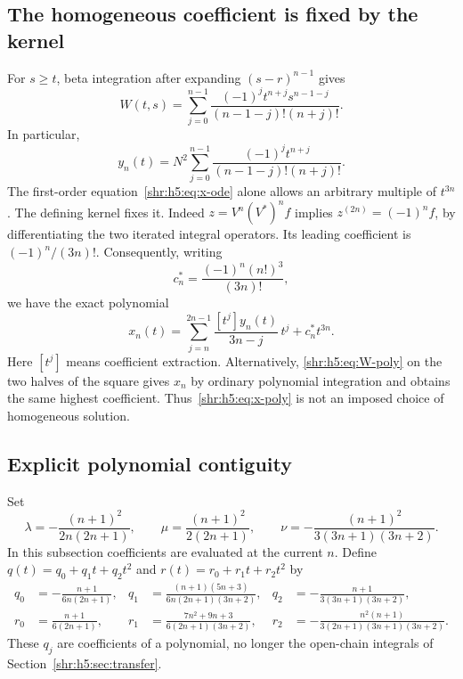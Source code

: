 \documentclass[11pt,letterpaper]{article}
\numberwithin{equation}{section}
\theoremstyle{definition}
\newcommand{\1}{\mathbf 1}
\begin{document}
\subsection{The homogeneous coefficient is fixed by the kernel}
For $s\ge t$, beta integration after expanding $(s-r)^{n-1}$ gives
\begin{equation}
 W(t,s)=\sum_{j=0}^{n-1}
 \frac{(-1)^jt^{n+j}s^{n-1-j}}{(n-1-j)!(n+j)!}.
 \label{shr:h5:eq:W-poly}
\end{equation}
In particular,
\begin{equation}
 y_n(t)=N^2\sum_{j=0}^{n-1}
 \frac{(-1)^jt^{n+j}}{(n-1-j)!(n+j)!}.
 \label{shr:h5:eq:y-poly}
\end{equation}
The first-order equation~\eqref{shr:h5:eq:x-ode} alone allows an arbitrary
multiple of $t^{3n}$. The defining kernel fixes it. Indeed
$z=V^n(V^*)^nf$ implies
$z^{(2n)}=(-1)^nf$, by differentiating the two iterated integral operators.
Its leading coefficient is $(-1)^n/(3n)!$. Consequently, writing
\begin{equation}
 c_n^*=\frac{(-1)^n(n!)^3}{(3n)!},
 \label{shr:h5:eq:cnstar}
\end{equation}
we have the exact polynomial
\begin{equation}
 x_n(t)=\sum_{j=n}^{2n-1}\frac{[t^j]y_n(t)}{3n-j}\,t^j
               +c_n^*t^{3n}.
 \label{shr:h5:eq:x-poly}
\end{equation}
Here $[t^j]$ means coefficient extraction. Alternatively,
\eqref{shr:h5:eq:W-poly} on the two halves of the square gives $x_n$ by
ordinary polynomial integration and obtains the same highest coefficient.
Thus~\eqref{shr:h5:eq:x-poly} is not an imposed choice of homogeneous solution.

\subsection{Explicit polynomial contiguity}
Set
\begin{equation}
 \lambda=-\frac{(n+1)^2}{2n(2n+1)},\qquad
 \mu=\frac{(n+1)^2}{2(2n+1)},\qquad
 \nu=-\frac{(n+1)^2}{3(3n+1)(3n+2)}.
 \label{shr:h5:eq:lambda-mu-nu}
\end{equation}
In this subsection coefficients are evaluated at the current $n$. Define
$q(t)=q_0+q_1t+q_2t^2$ and $r(t)=r_0+r_1t+r_2t^2$ by
\begin{align}
 q_0&=-\frac{n+1}{6n(2n+1)},&
 q_1&=\frac{(n+1)(5n+3)}{6n(2n+1)(3n+2)},&
 q_2&=-\frac{n+1}{3(3n+1)(3n+2)},\\
 r_0&=\frac{n+1}{6(2n+1)},&
 r_1&=\frac{7n^2+9n+3}{6(2n+1)(3n+2)},&
 r_2&=-\frac{n^2(n+1)}{3(2n+1)(3n+1)(3n+2)}.
 \label{shr:h5:eq:qr}
\end{align}
These $q_j$ are coefficients of a polynomial, no longer the open-chain
integrals of Section~\ref{shr:h5:sec:transfer}.
\end{document}
